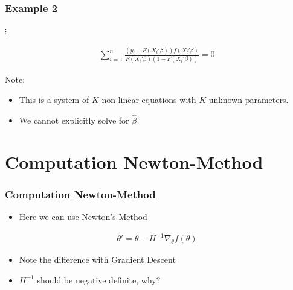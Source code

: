 \documentclass[
  shownotes,
  xcolor={svgnames},
  hyperref={colorlinks,citecolor=DarkBlue,linkcolor=DarkRed,urlcolor=DarkBlue}
  , aspectratio=169]{beamer}
\begin{document}
\begin{frame}[fragile]
\frametitle{Example 2}
\begin{centering}
$\vdots$
\end{centering}

\begin{align}
\sum_{i=1}^n\frac{(y_i-F(X_{i}'\beta))f(X_{i}'\beta)}{F(X_{i}'\beta)(1-F(X_{i}'\beta))}=0
\end{align}

\bigskip
Note:
\begin{itemize}
  \item This is a system of $K$ non linear equations with $K$ unknown parameters. 
  \item We cannot explicitly solve for $\hat \beta$
\end{itemize}


\end{frame}
\section{Computation Newton-Method}

\begin{frame}[fragile]
\frametitle{Computation Newton-Method}
\begin{itemize}
\item Here we can use Newton’s Method 
\end{itemize}
\bigskip
\begin{align}
    \theta'=\theta-H^{-1} \nabla_\theta f(\theta)
    \end{align}
\bigskip
\begin{itemize}
  \item Note the difference with Gradient Descent
  \medskip
  \item $H^{-1}$ should be negative definite, why? 
\end{itemize}

\end{frame}
\end{document}
